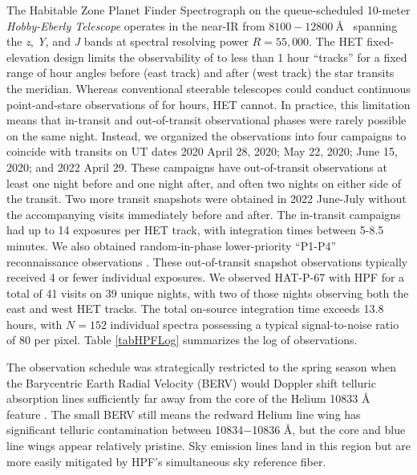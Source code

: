 \documentclass[linenumbers, twocolumn, trackchanges]{aastex631}
\begin{document}
The Habitable Zone Planet Finder Spectrograph \citep[HPF;][]{2012SPIE.8446E..1SM,2014SPIE.9147E..1GM, 2019Optic...6..233M} on the queue-scheduled 10-meter \emph{Hobby-Eberly Telescope} \citep[HET;][]{1998SPIE.3352...34R} operates in the near-IR from $8100-12800~$\AA~ spanning the \textit{z}, \textit{Y}, and \textit{J} bands at spectral resolving power $R=55,000$. The HET fixed-elevation design \citep{2007PASP..119..556S} limits the observability of  to less than 1 hour ``tracks'' for a fixed range of hour angles before (east track) and after (west track) the star transits the meridian.  Whereas conventional steerable telescopes could conduct continuous point-and-stare observations of  for hours, HET cannot.  In practice, this limitation means that in-transit and out-of-transit observational phases were rarely possible on the same night.  Instead, we organized the observations into four campaigns to coincide with  transits on UT dates 2020 April 28, 2020; May 22, 2020; June 15, 2020; and 2022 April 29.  These campaigns have out-of-transit observations at least one night before and one night after, and often two nights on either side of the transit.  Two more transit snapshots were obtained in 2022 June-July without the accompanying visits immediately before and after.  The in-transit campaigns had up to 14 exposures per HET track, with integration times between 5-8.5 minutes.  We also obtained random-in-phase lower-priority ``P1-P4'' reconnaissance observations \citep{2007PASP..119..556S}.  These out-of-transit snapshot observations typically received 4 or fewer individual exposures.  We observed HAT-P-67 with HPF for a total of 41 visits on 39 unique nights, with two of those nights observing both the east and west HET tracks.  The total on-source integration time exceeds 13.8 hours, with $N=152$ individual spectra possessing a typical signal-to-noise ratio of 80 per pixel.  Table \ref{tabHPFLog} summarizes the log of observations.

The observation schedule was strategically restricted to the spring season when the Barycentric Earth Radial Velocity (BERV) would Doppler shift telluric absorption lines sufficiently far away from the core of the Helium 10833 \AA~ feature \citep{2022ApJ...939L..11S}.  The small BERV still means the redward Helium line wing has significant telluric contamination between 10834$-$10836 \AA, but the core and blue line wings appear relatively pristine.  Sky emission lines land in this region but are more easily mitigated by HPF's simultaneous sky reference fiber.
\end{document}
